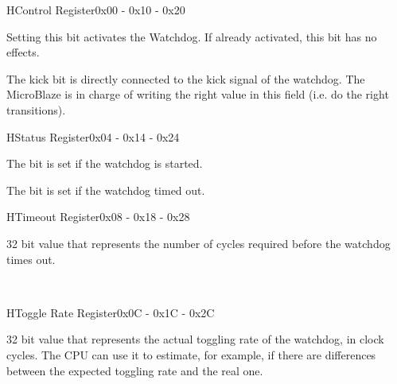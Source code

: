 \begin{center}
\begin{register}{H}{Control Register}{0x00 - 0x10 - 0x20}%
%
%
\begin{regdesc}\begin{reglist}
\item [Start]Setting this bit activates the Watchdog. If already activated, this bit has no effects.
\item [Kick]The kick bit is directly connected to the kick signal of the watchdog. The MicroBlaze is in charge of writing the right value in this field (i.e. do the right transitions).
\end{reglist}\end{regdesc}
\end{register}
\begin{register}{H}{Status Register}{0x04 - 0x14 - 0x24}%
%
%
\begin{regdesc}\begin{reglist}
\item [Started]The bit is set if the watchdog is started.
\item [Error]The bit is set if the watchdog timed out.
\end{reglist}\end{regdesc}
\end{register}
\begin{register}{H}{Timeout Register}{0x08 - 0x18 - 0x28}%
\begin{regdesc}\begin{reglist}
\item [Timeout]32 bit value that represents the number of cycles required before the watchdog times out.
\end{reglist}\end{regdesc}\
\end{register}
\begin{register}{H}{Toggle Rate Register}{0x0C - 0x1C - 0x2C}%
\regfieldb{Toggle Rate}{32}{0}%
\begin{regdesc}\begin{reglist}
\item [Toggle Rate]32 bit value that represents the actual toggling rate of the watchdog, in clock cycles. The CPU can use it to estimate, for example, if there are differences between the expected toggling rate and the real one.
\end{reglist}\end{regdesc}\
\end{register}
\end{center}

